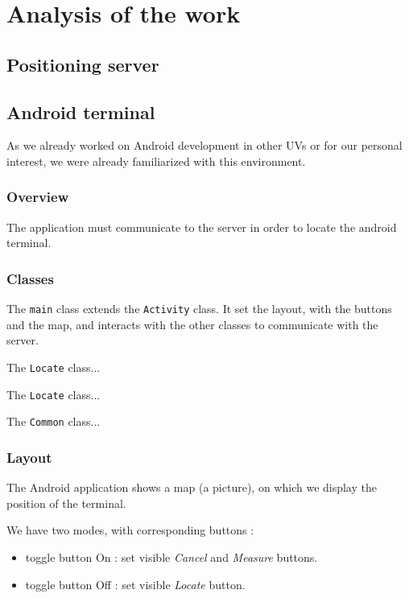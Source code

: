 \section{Analysis of the work}

\subsection{Positioning server}


\newpage
\subsection{Android terminal}

As we already worked on Android development in other UVs or for our personal
interest, we were already familiarized with this environment.

\subsubsection{Overview}

The application must communicate to the server in order to locate the android
terminal.

\subsubsection{Classes}

The \verb+main+ class extends the \verb+Activity+ class. It set the layout, with
the buttons and the map, and interacts with the other classes to communicate
with the server.

The \verb+Locate+ class... %

The \verb+Locate+ class... %

The \verb+Common+ class... %

\subsubsection{Layout}

The Android application shows a map (a picture), on which we display the
position of the terminal.

We have two modes, with corresponding buttons :

\begin{itemize}
    \item toggle button On : set visible \textit{Cancel} and \textit{Measure}
        buttons.
    \item toggle button Off : set visible \textit{Locate} button.
\end{itemize}

